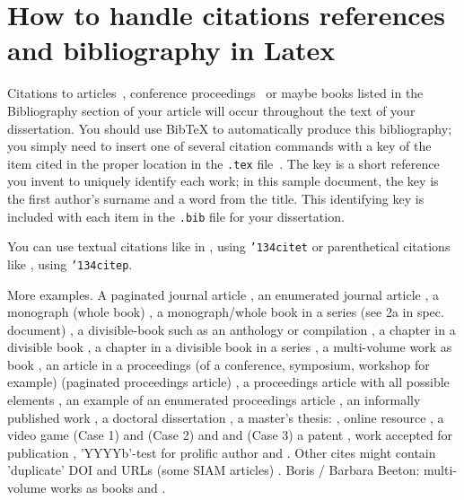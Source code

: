 \documentclass[12pt,MSc,a4paper,oneside]{muthesis}
\begin{document}
\chapter{How to handle citations references and bibliography in Latex}

Citations to articles~\citep{bowman:reasoning,
clark:pct, braams:babel, herlihy:methodology},
conference proceedings~\citep{clark:pct} or maybe
books \citep{Lamport:LaTeX, salas:calculus} listed
in the Bibliography section of your
article will occur throughout the text of your dissertation.
You should use BibTeX to automatically produce this bibliography;
you simply need to insert one of several citation commands with
a key of the item cited in the proper location in
the \texttt{.tex} file~\citep{Lamport:LaTeX}.
The key is a short reference you invent to uniquely
identify each work; in this sample document, the key is
the first author's surname and a
word from the title.  This identifying key is included
with each item in the \texttt{.bib} file for your dissertation.

You can use textual citations like in \citet{Abril07}, using \texttt{{\char'134}citet} or parenthetical citations like \citep{Abril07}, using \texttt{{\char'134}citep}.

More examples.  A paginated journal article \citep{Abril07}, an enumerated
journal article \citep{Cohen07}, 
a monograph (whole book) \citep{Kosiur01}, a monograph/whole book in a series
(see 2a in spec. document) \citep{Harel79}, a divisible-book such as an
anthology or compilation \citep{Editor00a}, a chapter
in a divisible book \citep{Spector90}, a chapter in a divisible book in a series
\citep{Douglass98}, a multi-volume work as book \citep{Knuth97}, an article in a
proceedings (of a conference, symposium, workshop for example) (paginated
proceedings article) \citep{Andler79}, a proceedings article with all possible
elements \citep{Smith10}, an example of an enumerated proceedings article
\citep{VanGundy07}, an informally published work \citep{Harel78}, a doctoral
dissertation \citep{Clarkson85}, a master's thesis: \citep{anisi03}, online resource \citep{Poker06}, a
video game (Case 1) \citep{Obama08} and (Case 2) \citep{Novak03} and \citep{Lee05}
and (Case 3) a patent \citep{JoeScientist001}, work accepted for publication
\citep{rous08}, 'YYYYb'-test for prolific author \citep{SaeediMEJ10} and
\citep{SaeediJETC10}. Other cites might contain 'duplicate' DOI and URLs (some
SIAM articles) \citep{Kirschmer:2010:AEI:1958016.1958018}.  Boris / Barbara
Beeton: multi-volume works as books \citep{MR781536} and \citep{MR781537}.
\end{document}
